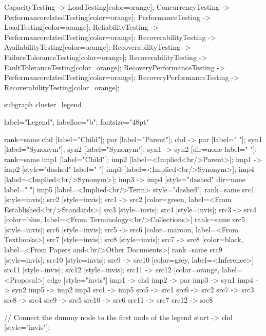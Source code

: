\documentclass{article}
\begin{document}
{CapacityTesting -> LoadTesting[color=orange];
ConcurrencyTesting -> PerformancerelatedTesting[color=orange];
PerformanceTesting -> LoadTesting[color=orange];
ReliabilityTesting -> PerformancerelatedTesting[color=orange];
RecoverabilityTesting -> AvailabilityTesting[color=orange];
RecoverabilityTesting -> FailureToleranceTesting[color=orange];
RecoverabilityTesting -> FaultToleranceTesting[color=orange];
RecoveryPerformanceTesting -> PerformancerelatedTesting[color=orange];
RecoveryPerformanceTesting -> RecoverabilityTesting[color=orange];

subgraph cluster_legend {

    label="Legend";
    labelloc="b";
    fontsize="48pt"

    {
        rank=same
        chd [label="Child"];
        par [label="Parent"];
        chd -> par [label="                "];
        syn1 [label="Synonym"];
        syn2 [label="Synonym"];
        syn1 -> syn2 [dir=none label="                "];
    }
    {
        rank=same
        imp1 [label="Child"];
        imp2 [label=<Implied<br/>Parent>];
        imp1 -> imp2 [style="dashed" label="                "]
        imp3 [label=<Implied<br/>Synonym>];
        imp4 [label=<Implied<br/>Synonym>];
        imp3 -> imp4 [style="dashed" dir=none label="                "]
    }
        imp5 [label=<Implied<br/>Term> style="dashed"]
{
rank=same
src1 [style=invis];
src2 [style=invis];
src1 -> src2 [color=green, label=<From Established<br/>Standards>]
src3 [style=invis];
src4 [style=invis];
src3 -> src4 [color=blue, label=<From Terminology<br/>Collections>]
}
{
rank=same
src5 [style=invis];
src6 [style=invis];
src5 -> src6 [color=maroon, label=<From Textbooks>]
src7 [style=invis];
src8 [style=invis];
src7 -> src8 [color=black, label=<From Papers and<br/>Other Documents>]
}
{
rank=same
src9 [style=invis];
src10 [style=invis];
src9 -> src10 [color=grey, label=<Inference>]
src11 [style=invis];
src12 [style=invis];
src11 -> src12 [color=orange, label=<Proposal>]
}
edge [style="invis"]
imp1 -> chd
imp2 -> par
imp3 -> syn1
imp4 -> syn2
imp5 -> { imp2 imp3 }
src1 -> imp5
src5 -> src1
src6 -> src2
src7 -> src3
src8 -> src4
src9 -> src5
src10 -> src6
src11 -> src7
src12 -> src8
}

// Connect the dummy node to the first node of the legend
start -> chd [style="invis"];
}
\end{document}
